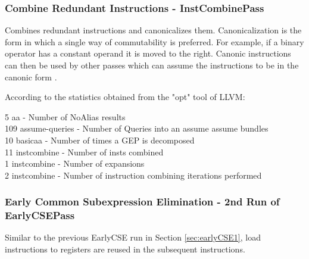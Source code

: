 

\subsubsection{Combine Redundant Instructions - InstCombinePass}
Combines redundant instructions and canonicalizes them. Canonicalization is the form in which a single way of commutability is preferred. For example, if a binary operator has a constant operand it is moved to the right. Canonic instructions can then be used by other passes which can assume the instructions to be in the canonic form \cite{llvmpass-instcombine}.
\par 





According to the statistics obtained from the "opt" tool of LLVM:
\begin{displayquote}
  5 aa             - Number of NoAlias results \\
109 assume-queries - Number of Queries into an assume assume bundles \\
 10 basicaa        - Number of times a GEP is decomposed \\
 11 instcombine    - Number of insts combined \\
  1 instcombine    - Number of expansions \\
  2 instcombine    - Number of instruction combining iterations performed \\
\end{displayquote}

\subsubsection{Early Common Subexpression Elimination - 2nd Run of EarlyCSEPass}
Similar to the previous EarlyCSE run in Section \ref{sec:earlyCSE1}, load instructions to registers are reused in the subsequent instructions.


